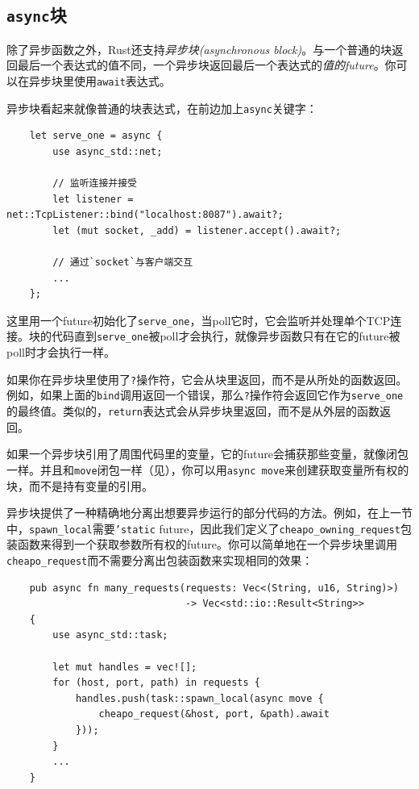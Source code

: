 \subsection{\texttt{async}块}
除了异步函数之外，Rust还支持\emph{异步块(asynchronous block)}。与一个普通的块返回最后一个表达式的值不同，一个异步块返回最后一个表达式的\emph{值的future}。你可以在异步块里使用\texttt{await}表达式。

异步块看起来就像普通的块表达式，在前边加上\texttt{async}关键字：
\begin{verbatim}
    let serve_one = async {
        use async_std::net;

        // 监听连接并接受
        let listener = net::TcpListener::bind("localhost:8087").await?;
        let (mut socket, _add) = listener.accept().await?;

        // 通过`socket`与客户端交互
        ...
    };
\end{verbatim}

这里用一个future初始化了\texttt{serve\_one}，当poll它时，它会监听并处理单个TCP连接。块的代码直到\texttt{serve\_one}被poll才会执行，就像异步函数只有在它的future被poll时才会执行一样。

如果你在异步块里使用了\texttt{?}操作符，它会从块里返回，而不是从所处的函数返回。例如，如果上面的\texttt{bind}调用返回一个错误，那么\texttt{?}操作符会返回它作为\texttt{serve\_one}的最终值。类似的，\texttt{return}表达式会从异步块里返回，而不是从外层的函数返回。

如果一个异步块引用了周围代码里的变量，它的future会捕获那些变量，就像闭包一样。并且和\texttt{move}闭包一样（见），你可以用\texttt{async move}来创建获取变量所有权的块，而不是持有变量的引用。

异步块提供了一种精确地分离出想要异步运行的部分代码的方法。例如，在上一节中，\texttt{spawn\_local}需要\texttt{'static} future，因此我们定义了\texttt{cheapo\_owning\_request}包装函数来得到一个获取参数所有权的future。你可以简单地在一个异步块里调用\texttt{cheapo\_request}而不需要分离出包装函数来实现相同的效果：
\begin{verbatim}
    pub async fn many_requests(requests: Vec<(String, u16, String)>)
                               -> Vec<std::io::Result<String>>
    {
        use async_std::task;

        let mut handles = vec![];
        for (host, port, path) in requests {
            handles.push(task::spawn_local(async move {
                cheapo_request(&host, port, &path).await
            }));
        }
        ...
    }
\end{verbatim}

